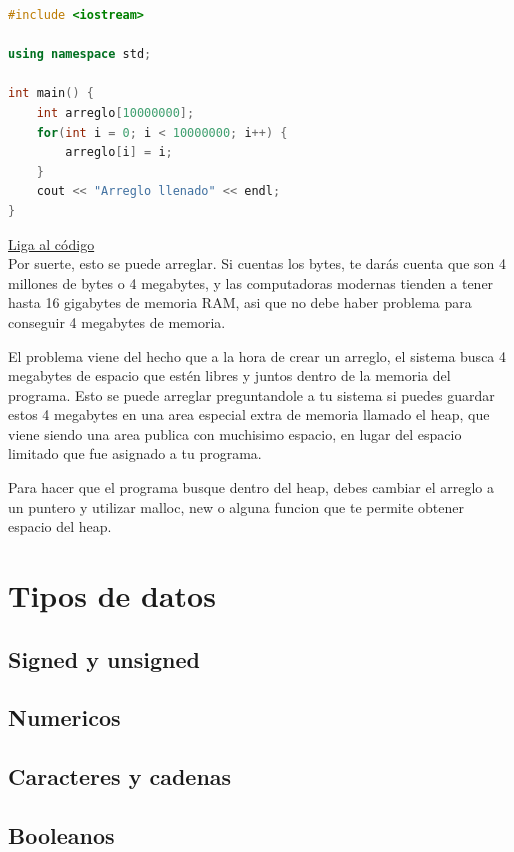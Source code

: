 \documentclass{article}
\begin{document}
\begin{lstlisting}[language=C++, caption=Faltas de memoria]
#include <iostream>

using namespace std;

int main() {
    int arreglo[10000000];
    for(int i = 0; i < 10000000; i++) {
        arreglo[i] = i;
    }
    cout << "Arreglo llenado" << endl;
}
\end{lstlisting}
\href{https://repl.it/@Jamesscn/Arreglo-no-arreglado}{Liga al código}\\

Por suerte, esto se puede arreglar. Si cuentas los bytes, te darás cuenta que son 4 millones de bytes o 4 megabytes, y las computadoras modernas tienden a tener hasta 16 gigabytes de memoria RAM, asi que no debe haber problema para conseguir 4 megabytes de memoria.

El problema viene del hecho que a la hora de crear un arreglo, el sistema busca 4 megabytes de espacio que estén libres y juntos dentro de la memoria del programa. Esto se puede arreglar preguntandole a tu sistema si puedes guardar estos 4 megabytes en una area especial extra de memoria llamado el heap, que viene siendo una area publica con muchisimo espacio, en lugar del espacio limitado que fue asignado a tu programa.

Para hacer que el programa busque dentro del heap, debes cambiar el arreglo a un puntero y utilizar malloc, new o alguna funcion que te permite obtener espacio del heap.

\section{Tipos de datos}

\subsection{Signed y unsigned}

\subsection{Numericos}

\subsection{Caracteres y cadenas}

\subsection{Booleanos}
\end{document}
